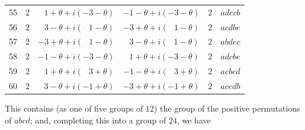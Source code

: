 \documentclass[11pt,a4paper]{article}
\begin{document}
\begin{center}
\begin{longtable}{r|c|c|c|c|l}
55 & $2$ & $\;\;\,1 + \theta + i(-3 - \theta)$
         & $-1 - \theta + i(-3 - \theta)$ & $2$ & $adecb$\\
56 & $2$ & $\;\;\,3 - \theta + i(\;\;\,1 - \theta)$
         & $-3 + \theta + i(\;\;\,1 - \theta)$ & $2$ & $acdbe$\\
57 & $2$ & $-3 + \theta + i(\;\;\,1 - \theta)$
         & $\;\;\,3 - \theta + i(\;\;\,1 - \theta)$ & $2$ & $abdec$\\
58 & $2$ & $-1 - \theta + i(-3 - \theta)$
         & $\;\;\,1 + \theta + i(-3 - \theta)$ & $2$ & $adcbe$\\
59 & $2$ & $\;\;\,1 + \theta + i(\;\;\,3 + \theta)$
         & $-1 - \theta + i(\;\;\,3 + \theta)$ & $2$ & $aebcd$\\
60 & $2$ & $\;\;\,3 - \theta + i(-1 + \theta)$
         & $-3 + \theta + i(-1 + \theta)$ & $2$ & $acedb$\\
\end{longtable}
\normalsize
\end{center}

This contains (as one of five groups of $12$) the group of the positive
permutations of $abcd$; and, completing this into a group of $24$, we have
\end{document}
